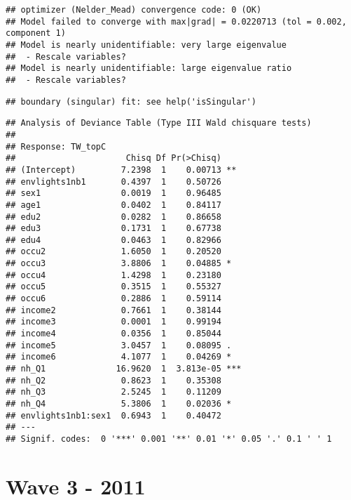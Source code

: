 \documentclass[
]{book}
\begin{document}
\begin{verbatim}
## optimizer (Nelder_Mead) convergence code: 0 (OK)
## Model failed to converge with max|grad| = 0.0220713 (tol = 0.002, component 1)
## Model is nearly unidentifiable: very large eigenvalue
##  - Rescale variables?
## Model is nearly unidentifiable: large eigenvalue ratio
##  - Rescale variables?
\end{verbatim}

\begin{verbatim}
## boundary (singular) fit: see help('isSingular')
\end{verbatim}

\begin{verbatim}
## Analysis of Deviance Table (Type III Wald chisquare tests)
## 
## Response: TW_topC
##                      Chisq Df Pr(>Chisq)    
## (Intercept)         7.2398  1    0.00713 ** 
## envlights1nb1       0.4397  1    0.50726    
## sex1                0.0019  1    0.96485    
## age1                0.0402  1    0.84117    
## edu2                0.0282  1    0.86658    
## edu3                0.1731  1    0.67738    
## edu4                0.0463  1    0.82966    
## occu2               1.6050  1    0.20520    
## occu3               3.8806  1    0.04885 *  
## occu4               1.4298  1    0.23180    
## occu5               0.3515  1    0.55327    
## occu6               0.2886  1    0.59114    
## income2             0.7661  1    0.38144    
## income3             0.0001  1    0.99194    
## income4             0.0356  1    0.85044    
## income5             3.0457  1    0.08095 .  
## income6             4.1077  1    0.04269 *  
## nh_Q1              16.9620  1  3.813e-05 ***
## nh_Q2               0.8623  1    0.35308    
## nh_Q3               2.5245  1    0.11209    
## nh_Q4               5.3806  1    0.02036 *  
## envlights1nb1:sex1  0.6943  1    0.40472    
## ---
## Signif. codes:  0 '***' 0.001 '**' 0.01 '*' 0.05 '.' 0.1 ' ' 1
\end{verbatim}

\hypertarget{wave-3---2011}{%
\section{Wave 3 - 2011}\label{wave-3---2011}}
\end{document}
